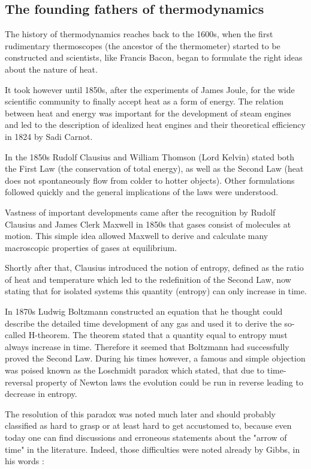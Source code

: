 \documentclass[a4paper,12pt]{article}
\begin{document}
\subsection{The founding fathers of thermodynamics}
The history of thermodynamics reaches back to the 1600s, when the first rudimentary thermoscopes (the ancestor of the thermometer) started to be constructed and scientists, like Francis Bacon, began to formulate the right ideas about the nature of heat. 

It took however until 1850s, after the experiments of James Joule, for the wide scientific community to finally accept heat as a form of energy. The relation between heat and energy was important for the development of steam engines and led to the description of idealized heat engines and their theoretical efficiency in 1824 by Sadi Carnot. 

In the 1850s Rudolf Clausius and William Thomson (Lord Kelvin) stated both the First Law (the conservation of total energy), as well as the Second Law (heat does not spontaneously flow from colder to hotter objects). Other formulations followed quickly and the general implications of the laws were understood. 

Vastness of important developments came after the recognition by Rudolf Clausius and James Clerk Maxwell in 1850s that gases consist of molecules at motion. This simple idea allowed Maxwell to derive and calculate many macroscopic properties of gases at equilibrium. 

Shortly after that, Clausius introduced the notion of entropy, defined as the ratio of heat and temperature which led to the redefinition of the Second Law, now stating that for isolated systems this quantity (entropy) can only increase in time.

In 1870s Ludwig Boltzmann constructed an equation that he thought could describe the detailed time development of any gas and used it to derive the so-called H-theorem. The theorem stated that a quantity equal to entropy must always increase in time. Therefore it seemed that Boltzmann had successfully proved the Second Law. During his times however, a famous and simple objection was poised known as the Loschmidt paradox which stated, that due to time-reversal property of Newton laws the evolution could be run in reverse leading to decrease in entropy. 

The resolution of this paradox was noted much later and should probably classified as hard to grasp or at least hard to get accustomed to, because even today one can find discussions and erroneous statements about the "arrow of time" in the literature. Indeed, those difficulties were noted already by Gibbs, in his words \cite{Gibbs:1928tw}:
\end{document}
